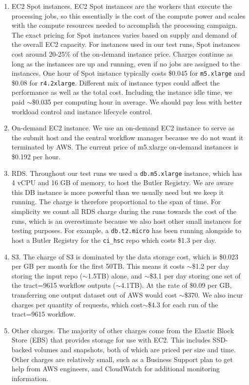 \begin{enumerate}
\item EC2 Spot instances.
EC2 Spot instances are the workers that execute the processing jobs, so this essentially is the cost of the compute power and scales with the compute resources needed to accomplish the processing campaign.
The exact pricing for Spot instances varies based on supply and demand of the overall EC2 capacity.
For instances used in our test runs, Spot instances cost around 20-25\% of the on-demand instance price.
Charges continue as long as the instances are up and running, even if no jobs are assigned to the instances.
One hour of Spot instance typically costs \$0.045 for \texttt{m5.xlarge} and \$0.08 for \texttt{r4.2xlarge}.
Different mix of instance types could affect the performance as well as the total cost.
Including the instance idle time, we paid $\sim\$$0.035 per computing hour in average.
We should pay less with better workload control and instance lifecycle control.

\item On-demand EC2 instance.
We use an on-demand EC2 instance to serve as the submit host and the central workflow manager because we do not want it terminated by AWS.
The current price of m5.xlarge on-demand instances is \$0.192 per hour.

\item RDS.
Throughout our test runs we used a \texttt{db.m5.xlarge} instance, which has 4 vCPU and 16 GB of memory, to host the Butler Registry.
We are aware this DB instance is more powerful than we usually need but we keep it running.
The charge is therefore proportional to the span of time.
For simplicity we count all RDS charge during the runs towards the cost of the runs, which is an overestimate because we also host other small instances for testing purposes.
For example, a \texttt{db.t2.micro} has been running alongside to host a Butler Registry for the \texttt{ci\_hsc} repo which costs \$1.3 per day.

\item S3.
The charge of S3 is dominated by the data storage cost, which is \$0.023 per GB per month for the first 50TB.
This means it costs $\sim$\$1.2 per day storing the input repo ($\sim$1.5TB) alone, and $\sim$\$3.1 per day storing one set of the tract=9615 workflow outputs ($\sim$4.1TB).
At the rate of \$0.09 per GB, transferring one output dataset out of AWS would cost $\sim$\$370.
We also incur charges per quantity of requests, which cost$\sim$\$4.3 for each run of the tract=9615 workflow.

\item Other charges.
The majority of other charges come from the Elastic Block Store (EBS) that provides storage for use with EC2.
This includes SSD-backed volumes and snapshots, both of which are priced per size and time.
Other charges are relatively small, such as a Business Support plan to get help from AWS engineers, and CloudWatch for additional monitoring information.

\end{enumerate}

